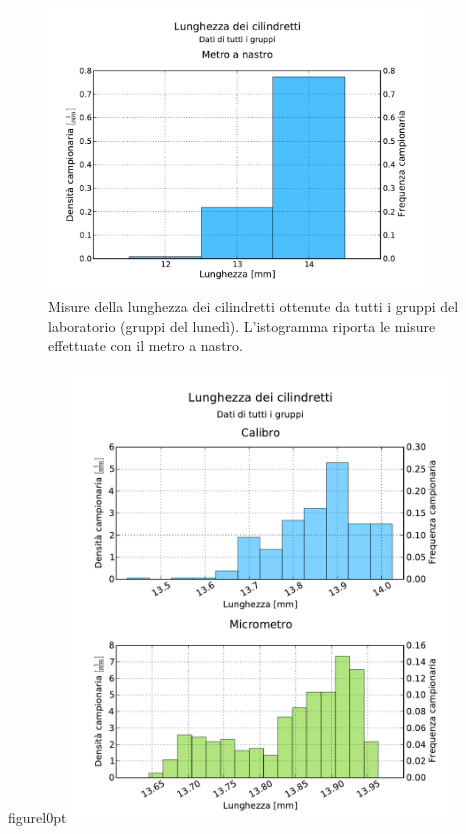 \begin{figure}
	\centering
	\includegraphics[width=100mm]{grafici/cilindri_tutti.pdf}
	\caption{Misure della lunghezza dei cilindretti ottenute da tutti i gruppi del
        laboratorio (gruppi del lunedì). L'istogramma riporta le misure effettuate con
        il metro a nastro.}
\end{figure}

\begin{wrapfloat}{figure}{l}{0pt}
	\centering
	\includegraphics[width=100mm]{grafici/cilindri_tutti_2.pdf}
    \caption{Lunghezza dei cilindretti ottenute da tutti i gruppi (del lunedì)
        del corso di laboratorio. L'istogramma relativo alle misure con il calibro
        ha binning di 0.05 mm, mentre nell'istogramma delle misure effettuate con
        il micrometro i bin sono da 0.02 mm}
\end{wrapfloat}

